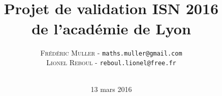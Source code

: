 


\lfoot[\thepage]{}
\rfoot[]{\thepage}




\title{\\ \medskip \medskip \large{Projet de validation ISN 2016\\de l'académie de Lyon}}
\author{\textsc{Frédéric Muller} - \texttt{maths.muller@gmail.com}\\ \textsc{Lionel Reboul} - \texttt{reboul.lionel@free.fr}\\ \\
   }
\date{13 mars 2016}

\maketitle


\clearpage{\pagestyle{empty}\cleardoublepage}
\setcounter{tocdepth}{1}
\tableofcontents
\thispagestyle{fancy}



%








